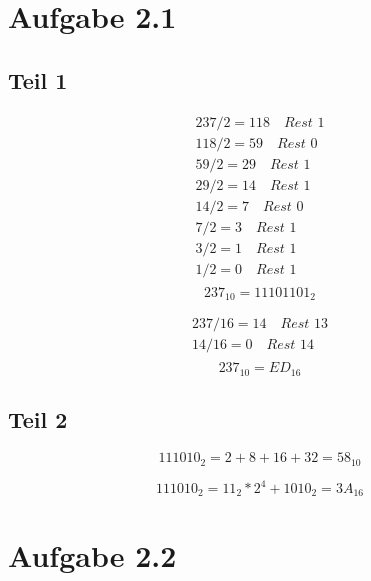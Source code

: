 \documentclass[10pt,a4paper]{article}
\begin{document}
\section*{Aufgabe 2.1}

\subsection*{Teil 1}

\begin{align*}
237 / 2 = 118 \quad \textit{Rest $1$}\\
118 / 2 = 59 \quad \textit{Rest $0$}\\
59 / 2 = 29 \quad \textit{Rest $1$}\\
29 / 2 = 14 \quad \textit{Rest $1$}\\
14 / 2 = 7 \quad \textit{Rest $0$}\\
7 / 2 = 3 \quad \textit{Rest $1$}\\
3 / 2 = 1 \quad \textit{Rest $1$}\\
1 / 2 = 0 \quad \textit{Rest $1$}\\
\end{align*}
\begin{equation}
237_{10} = 11101101_{2}
\end{equation}

\begin{align*}
237 / 16 = 14 \quad \textit{Rest $13$}\\
14 / 16 = 0 \quad \textit{Rest $14$}\\
\end{align*}
\begin{equation}
237_{10} = ED_{16}
\end{equation}

\subsection*{Teil 2}

\begin{equation}
111010_{2} = 2 + 8 + 16 + 32 = 58_{10}
\end{equation}

\begin{equation}
111010_{2} = 11_{2} * 2^4 + 1010_{2} = 3A_{16}
\end{equation}

\section*{Aufgabe 2.2}
\end{document}
